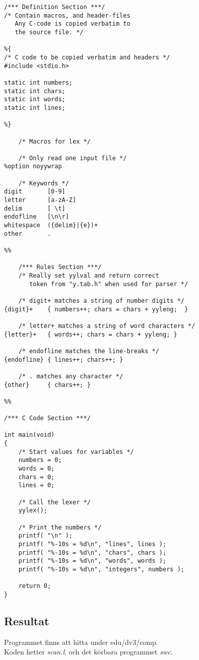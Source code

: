 \documentclass[10pt, titlepage, oneside, a4paper]{article}
\def\path{edu/dv3/comp}
\begin{document}
\begin{footnotesize}
\begin{verbatim}
/*** Definition Section ***/
/* Contain macros, and header-files
   Any C-code is copied verbatim to 
   the source file. */

%{
/* C code to be copied verbatim and headers */
#include <stdio.h>

static int numbers;
static int chars;
static int words;
static int lines;

%}

	/* Macros for lex */

	/* Only read one input file */
%option noyywrap

	/* Keywords */
digit 		[0-9]
letter 		[a-zA-Z]
delim 	 	[ \t]
endofline 	[\n\r]
whitespace 	({delim}|{e})+
other 		.

%%

	/*** Rules Section ***/
	/* Really set yylval and return correct
	   token from "y.tab.h" when used for parser */

	/* digit+ matches a string of number digits */
{digit}+	{ numbers++; chars = chars + yyleng;  }

	/* letter+ matches a string of word characters */
{letter}+	{ words++; chars = chars + yyleng; }

	/* endofline matches the line-breaks */
{endofline}	{ lines++; chars++; }

	/* . matches any character */
{other}		{ chars++; }

%%

/*** C Code Section ***/

int main(void)
{
	/* Start values for variables */
	numbers = 0;
	words = 0;
	chars = 0;
	lines = 0;

	/* Call the lexer */
	yylex();

	/* Print the numbers */
	printf( "\n" );
	printf( "%-10s = %d\n", "lines", lines );
	printf( "%-10s = %d\n", "chars", chars );
	printf( "%-10s = %d\n", "words", words );
	printf( "%-10s = %d\n", "integers", numbers );
	
	return 0;
}
\end{verbatim}	

\end{footnotesize}


	\subsection{Resultat}
	
	Programmet finns att hitta under \path.\\
	Koden hetter \textit{scan.l}, och det körbara programmet \textit{swc}.
	
\end{document}
